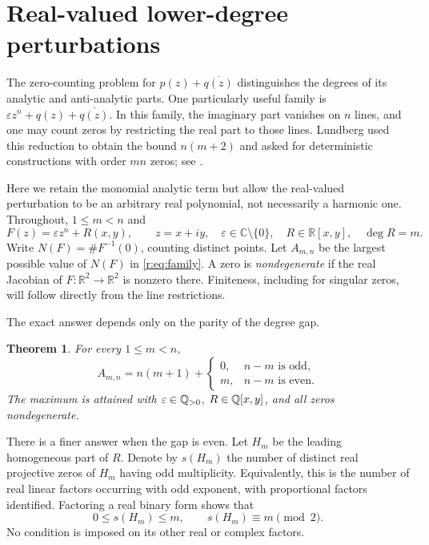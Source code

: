 \documentclass[UTF8,11pt]{ctexart}
\newtheorem{thm}{Theorem}[section]
\theoremstyle{definition}
\numberwithin{equation}{section}
\newcommand{\C}{\mathbb C}\newcommand{\R}{\mathbb R}
\newcommand{\eps}{\varepsilon}\newcommand{\ep}{\varepsilon}
\begin{document}
\section{Real-valued lower-degree perturbations}\label{r:sec:real}

The zero-counting problem for $p(z)+\overline{q(z)}$ distinguishes the
degrees of its analytic and anti-analytic parts. One particularly useful
family is $\eps z^n+q(z)+\overline{q(z)}$. In this family, the imaginary
part vanishes on $n$ lines, and one may count zeros by restricting the
real part to those lines. Lundberg used this reduction to obtain the
bound $n(m+2)$ and asked for deterministic constructions with order
$mn$ zeros; see \cite[Sections~4.1--4.2, author version, pp.~8--9]{Lun23}.

Here we retain the monomial analytic term but allow the real-valued
perturbation to be an arbitrary real polynomial, not necessarily a
harmonic one. Throughout, $1\le m<n$ and
\begin{equation}\label{r:eq:family}
 F(z)=\eps z^n+R(x,y),\qquad z=x+iy,\quad
 \eps\in\C\setminus\{0\},\quad R\in\R[x,y],\quad\deg R=m.
\end{equation}
Write $N(F)=\#F^{-1}(0)$, counting distinct points. Let $A_{m,n}$ be the
largest possible value of $N(F)$ in \eqref{r:eq:family}. A zero is
\emph{nondegenerate} if the real Jacobian of $F:\R^2\to\R^2$ is nonzero
there. Finiteness, including for singular zeros, will follow directly
from the line restrictions.

The exact answer depends only on the parity of the degree gap.
\begin{thm}\label{r:thm:main}
For every $1\le m<n$,
\begin{equation}\label{r:eq:maximum}
 A_{m,n}=n(m+1)+
 \begin{cases}
 0,&n-m\text{ is odd},\\
 m,&n-m\text{ is even}.
 \end{cases}
\end{equation}
The maximum is attained with $\eps\in\Q_{>0}$, $R\in\mathbb Q[x,y]$, and all
zeros nondegenerate.
\end{thm}

There is a finer answer when the gap is even. Let $H_m$ be the leading
homogeneous part of $R$. Denote by $s(H_m)$ the number of distinct real
projective zeros of $H_m$ having odd multiplicity. Equivalently, this is
the number of real linear factors occurring with odd exponent, with
proportional factors identified. Factoring a real binary form shows that
\[
 0\le s(H_m)\le m,\qquad s(H_m)\equiv m\pmod2.
\]
No condition is imposed on its other real or complex factors.
\end{document}
